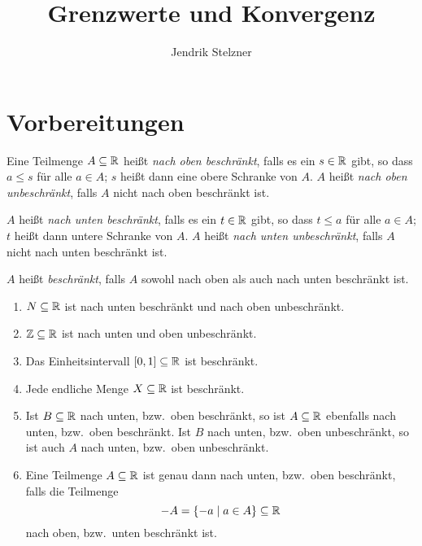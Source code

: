 \documentclass[a4paper,10pt]{article}
\title{Grenzwerte und Konvergenz}
\author{Jendrik Stelzner}
\date{}
\begin{document}
\maketitle

\tableofcontents





\section{Vorbereitungen}


\begin{defi}
 Eine Teilmenge $A \subseteq \mathbb{R}$ heißt \emph{nach oben beschränkt}, falls es ein $s \in \mathbb{R}$ gibt, so dass $a \leq s$ für alle $a \in A$; $s$ heißt dann eine obere Schranke von $A$. $A$ heißt \emph{nach oben unbeschränkt}, falls $A$ nicht nach oben beschränkt ist.
 
 $A$ heißt \emph{nach unten beschränkt}, falls es ein $t \in \mathbb{R}$ gibt, so dass $t \leq a$ für alle $a \in A$; $t$ heißt dann untere Schranke von $A$. $A$ heißt \emph{nach unten unbeschränkt}, falls $A$ nicht nach unten beschränkt ist.
 
 $A$ heißt \emph{beschränkt}, falls $A$ sowohl nach oben als auch nach unten beschränkt ist.
\end{defi}


\begin{bsp}
 \begin{enumerate}
  \item
   $N \subseteq \mathbb{R}$ ist nach unten beschränkt und nach oben unbeschränkt.
  \item
   $\mathbb{Z} \subseteq \mathbb{R}$ ist nach unten und oben unbeschränkt.
  \item
   Das Einheitsintervall $[0,1] \subseteq \mathbb{R}$ ist beschränkt.
  \item
   Jede endliche Menge $X \subseteq \mathbb{R}$ ist beschränkt.
  \item
   Ist $B \subseteq \mathbb{R}$ nach unten, bzw.\ oben beschränkt, so ist $A \subseteq \mathbb{R}$ ebenfalls nach unten, bzw.\ oben beschränkt. Ist $B$ nach unten, bzw.\ oben unbeschränkt, so ist auch $A$ nach unten, bzw.\ oben unbeschränkt.
  \item
   Eine Teilmenge $A \subseteq \mathbb{R}$ ist genau dann nach unten, bzw.\ oben beschränkt, falls die Teilmenge
   \[
    -A = \{-a \mid a \in A\} \subseteq \mathbb{R}
   \]
   nach oben, bzw.\ unten beschränkt ist.
 \end{enumerate}
\end{bsp}
\end{document}
